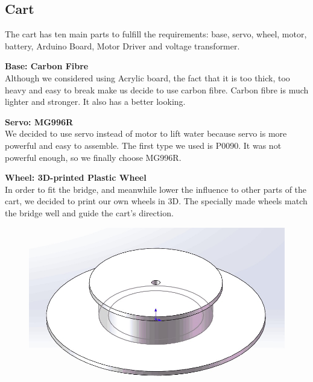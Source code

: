 \subsection{Cart}

The cart has ten main parts to fulfill the requirements: base, servo, wheel,
motor, battery, Arduino Board, Motor Driver and voltage transformer.

\bigskip
\noindent
\textbf{Base: Carbon Fibre} \\
\indent
Although we considered using Acrylic board, the fact that it is too thick, too
heavy and easy to break make us decide to use carbon fibre.
Carbon fibre is much lighter and stronger.
It also has a better looking. 

\bigskip
\noindent
\textbf{Servo: MG996R}  \\
\indent
We decided to use servo instead of motor to lift water because servo is more
powerful and easy to assemble. 
The first type we used is P0090.
It was not powerful enough, so we finally choose MG996R. 

\bigskip
\noindent
\textbf{Wheel: 3D-printed Plastic Wheel } \\
\indent
In order to fit the bridge, and meanwhile lower the influence to other parts of
the cart, we decided to print our own wheels in 3D.
The specially made wheels match the bridge well and guide the cart’s direction.

\begin{figure}[H]
\begin{center}
\includegraphics[width=15cm]{figure/designOverview/p2}
\end{center}
\end{figure}

